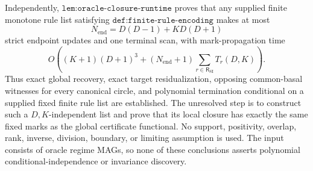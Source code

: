 Independently, \(\texttt{lem:oracle-closure-runtime}\) proves that any supplied finite monotone rule list satisfying \(\texttt{def:finite-rule-encoding}\) makes at most
\[
N_{\mathrm{end}}=D(D-1)+KD(D+1)
\]
strict endpoint updates and one terminal scan, with mark-propagation time
\[
O\!\left(
(K+1)(D+1)^3+
(N_{\mathrm{end}}+1)
\sum_{r\in\mathsf R_{\mathrm{SI}}}T_r(D,K)
\right).
\]
Thus exact global recovery, exact target residualization, opposing common-basal witnesses for every canonical circle, and polynomial termination conditional on a supplied fixed finite rule list are established.  The unresolved step is to construct such a \(D,K\)-independent list and prove that its local closure has exactly the same fixed marks as the global certificate functional.  No support, positivity, overlap, rank, inverse, division, boundary, or limiting assumption is used.  The input consists of oracle regime MAGs, so none of these conclusions asserts polynomial conditional-independence or invariance discovery.